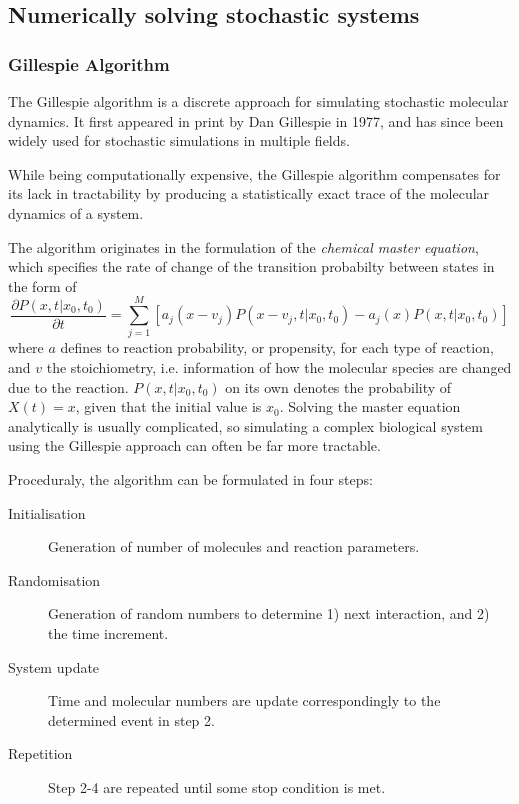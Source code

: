 \subsection[Stochastic Simulations]{Numerically solving stochastic systems}
\subsubsection{Gillespie Algorithm}
The Gillespie algorithm is a discrete approach for simulating stochastic
molecular dynamics. It first appeared in print by Dan Gillespie in 1977, and has
since been widely used for stochastic simulations in multiple fields.

While being computationally expensive, the Gillespie algorithm compensates for
its lack in tractability by producing a statistically exact trace of the
molecular dynamics of a system. 

The algorithm originates in the formulation of the \textit{chemical master equation},
which specifies the rate of change of the transition probabilty between states
in the form of 
\begin{equation}
  \dfrac{\partial P\left( x,t | x_0, t_0 \right)}{\partial t} = 
  \sum_{j =
    1}^{M} \left[ a_j\left( x-v_j \right)P\left( x-v_j, t|x_0,t_0 \right) -
    a_j(x)P\left( x,t|x_0,t_0 \right) \right]
\end{equation}
where $a$ defines to reaction probability, or propensity, for each type of reaction, and
$v$ the stoichiometry, i.e. information of how the molecular species are changed
due to the reaction. $P(x,t | x_0, t_0)$ on its own denotes the probability of
$X(t) = x$, given that the initial value is $x_0$. Solving the master equation
analytically is usually complicated, so  
simulating a complex biological system using the Gillespie approach can often be
far more tractable.

Proceduraly, the algorithm can be formulated in four steps: 
\begin{description}
  \item[Initialisation] Generation of number of molecules and reaction
    parameters. 
  \item[Randomisation] Generation of random numbers to determine 1) next
    interaction, and 2) the time increment.
  \item[System update] Time and molecular numbers are update correspondingly
    to the determined event in step 2.
  \item[Repetition] Step 2-4 are repeated until some stop condition is met.
\end{description}


